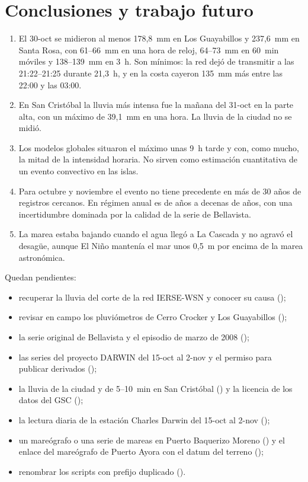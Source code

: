 \documentclass{sosg-informe}
\begin{document}
\section{Conclusiones y trabajo futuro}
\begin{enumerate}
  \item El 30-oct se midieron al menos 178,8~mm en Los Guayabillos y 237,6~mm en Santa Rosa, con 61--66~mm en una hora de reloj, 64--73~mm en 60~min móviles y 138--139~mm en 3~h. Son mínimos: la red dejó de transmitir a las 21:22--21:25 durante 21,3~h, y en la costa cayeron 135~mm más entre las 22:00 y las 03:00.
  \item En San Cristóbal la lluvia más intensa fue la mañana del 31-oct en la parte alta, con un máximo de 39,1~mm en una hora. La lluvia de la ciudad no se midió.
  \item Los modelos globales situaron el máximo unas 9~h tarde y con, como mucho, la mitad de la intensidad horaria. No sirven como estimación cuantitativa de un evento convectivo en las islas.
  \item Para octubre y noviembre el evento no tiene precedente en más de 30 años de registros cercanos. En régimen anual es de años a decenas de años, con una incertidumbre dominada por la calidad de la serie de Bellavista.
  \item La marea estaba bajando cuando el agua llegó a La Cascada y no agravó el desagüe, aunque El Niño mantenía el mar unos 0,5~m por encima de la marea astronómica.
\end{enumerate}

Quedan pendientes:
\begin{itemize}
  \item recuperar la lluvia del corte de la red IERSE-WSN y conocer su causa ();
  \item revisar en campo los pluviómetros de Cerro Crocker y Los Guayabillos ();
  \item la serie original de Bellavista y el episodio de marzo de 2008 ();
  \item las series del proyecto DARWIN del 15-oct al 2-nov y el permiso para publicar derivados ();
  \item la lluvia de la ciudad y de 5--10~min en San Cristóbal () y la licencia de los datos del GSC ();
  \item la lectura diaria de la estación Charles Darwin del 15-oct al 2-nov ();
  \item un mareógrafo o una serie de mareas en Puerto Baquerizo Moreno () y el enlace del mareógrafo de Puerto Ayora con el datum del terreno ();
  \item renombrar los scripts con prefijo duplicado ().
\end{itemize}
\end{document}
